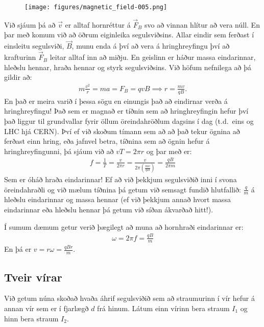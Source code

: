 \begin{figure}[H]
    \centering
    \texttt{[image: figures/magnetic\_field-005.png]}
\end{figure}
Við sjáum þá að $\vec{v}$ er alltaf hornréttur á $\vec{F}_B$ svo að vinnan hlítur að vera núll. En þar með komum við að öðrum eiginleika segulsviðsins. Allar eindir sem ferðast í einsleitu segulsviði, $\vec{B}$, munu enda á því að vera á hringhreyfingu því að krafturinn $\vec{F}_B$ leitar alltaf inn að miðju. En geislinn er háður massa eindarinnar, hleðslu hennar, hraða hennar og styrk segulsviðsins. Við höfum nefnilega að þá gildir að:
\begin{align*}
    m \frac{v^2}{r} = ma = F_B = qvB \implies r = \frac{mv}{qB}.
\end{align*}
En það er meira varið í þessa sögu en einungis það að eindirnar verða á hringhreyfingu! Það sem er magnað er tíðnin sem að hringhreyfingin hefur því það liggur til grundvallar fyrir öllum öreindahröðlum dagsins í dag (t.d.~eins og LHC hjá CERN). Því ef við skoðum tímann sem að að það tekur ögnina að ferðast einn hring, eða jafnvel betra, tíðnina sem að ögnin hefur á hringhreyfingunni, þá sjáum við að $v T = 2\pi r$ og þar með er:
\begin{align*}
    f = \frac{1}{T} = \frac{v}{2\pi r} = \frac{v}{2\pi \left( \frac{mv}{qB} \right)} = \frac{qB}{2\pi m}
\end{align*}
Sem er óháð hraða eindarinnar! Ef að við þekkjum segulsviðið inni í svona öreindahraðli og við mælum tíðnina þá getum við semsagt fundið hlutfallið: $\frac{q}{m}$ á hleðslu eindarinnar og massa hennar (ef við þekkjum annað hvort massa eindarinnar eða hleðslu hennar þá getum við síðan ákvarðað hitt!).

Í sumum dæmum getur verið þægilegt að muna að hornhraði eindarinnar er:
\begin{align*}
    \omega = 2\pi f = \frac{qB}{m}
\end{align*}
En þá er $v = r\omega = \frac{qBr}{m}$.

\newpage


\subsection*{Tveir vírar}

Við getum núna skoðað hvaða áhrif segulsviðið sem að straumurinn í vír hefur á annan vír sem er í fjarlægð $d$ frá hinum. Látum einn vírinn bera straum $I_1$ og hinn bera straum $I_2$.

